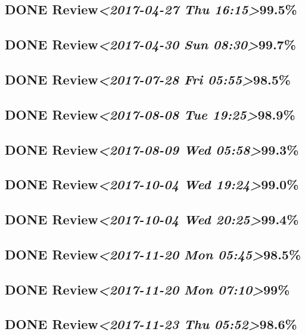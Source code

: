 \documentclass[11pt]{ctexart}
\begin{document}
\subsection{{\bfseries\sffamily DONE} Review\textit{<2017-04-27 Thu 16:15>}99.5\%}
\label{sec:org4fddcd1}
\subsection{{\bfseries\sffamily DONE} Review\textit{<2017-04-30 Sun 08:30>}99.7\%}
\label{sec:orga0d7e80}
\subsection{{\bfseries\sffamily DONE} Review\textit{<2017-07-28 Fri 05:55>}98.5\%}
\label{sec:org60e2c63}
\subsection{{\bfseries\sffamily DONE} Review\textit{<2017-08-08 Tue 19:25>}98.9\%}
\label{sec:org5d6cbfd}
\subsection{{\bfseries\sffamily DONE} Review\textit{<2017-08-09 Wed 05:58>}99.3\%}
\label{sec:org55a4279}
\subsection{{\bfseries\sffamily DONE} Review\textit{<2017-10-04 Wed 19:24>}99.0\%}
\label{sec:orgaf3d3a1}
\subsection{{\bfseries\sffamily DONE} Review\textit{<2017-10-04 Wed 20:25>}99.4\%}
\label{sec:org9a75cf7}

\subsection{{\bfseries\sffamily DONE} Review\textit{<2017-11-20 Mon 05:45>}98.5\%}
\label{sec:orgbc2917a}
\subsection{{\bfseries\sffamily DONE} Review\textit{<2017-11-20 Mon 07:10>}99\%}
\label{sec:orgde9f00c}
\subsection{{\bfseries\sffamily DONE} Review\textit{<2017-11-23 Thu 05:52>}98.6\%}
\label{sec:orgd92837c}
\end{document}
